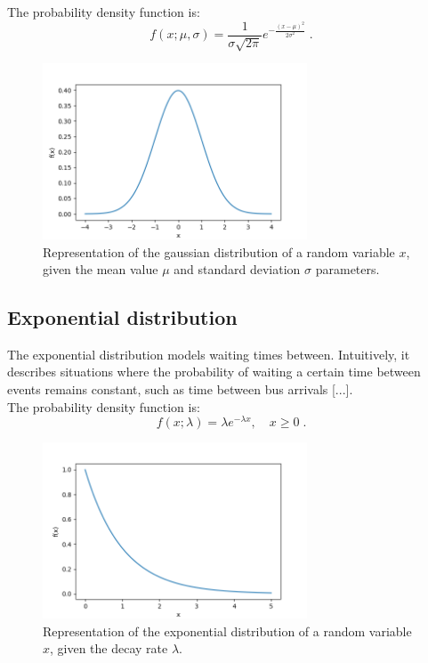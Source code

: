 \documentclass{book}
\begin{document}
The probability density function is:
\begin{equation}
    f(x; \mu, \sigma) = \frac{1}{\sigma \sqrt{2\pi}} e^{-\frac{(x-\mu)^2}{2\sigma^2}} \; .
\end{equation}

\begin{figure}[ht]
    \centering
    \includegraphics[width=0.7\textwidth]{figures/chapter2/normal.png}
    \caption{Representation of the gaussian distribution of a random variable $x$, given the mean value $\mu$ and standard deviation $\sigma$ parameters.}
    \label{fig:gaussian1}
\end{figure}

\newpage

\subsection{Exponential distribution}
The exponential distribution models waiting times between. Intuitively, it describes situations where the probability of waiting a certain time between events remains constant, such as time between bus arrivals [...].\\

The probability density function is:
\begin{equation}
    f(x; \lambda) = \lambda e^{-\lambda x}, \quad x \geq 0 \; .
\end{equation}

\begin{figure}[ht]
    \centering
    \includegraphics[width=0.7\textwidth]{figures/chapter2/exponential.png}
    \caption{Representation of the exponential distribution of a random variable $x$, given the decay rate $\lambda$.}
    \label{fig:exponential1}
\end{figure}
\end{document}
